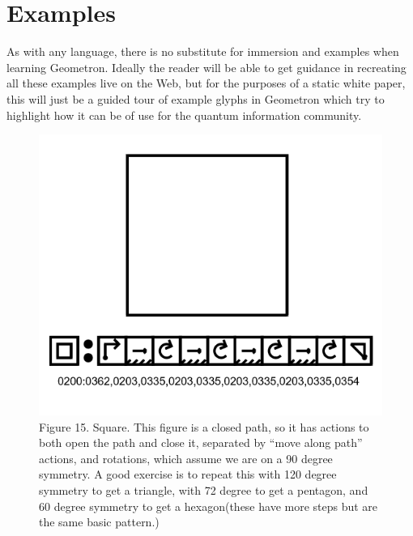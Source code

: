 \documentclass[11pt]{article}
\begin{document}
\section{Examples}


    As with any language, there is no substitute for immersion and examples when learning Geometron.  Ideally the reader will be able to get guidance in recreating all these examples live on the Web, but for the purposes of a static white paper, this will just be a guided tour of example glyphs in Geometron which try to highlight how it can be of use for the quantum information community.



\begin{figure}

\includegraphics[width=\linewidth]{figures/figure15_square.png}

\caption{Figure 15. Square.  This figure is a closed path, so it has actions to both open the path and close it, separated by ``move along path'' actions, and rotations, which assume we are on a 90 degree symmetry.  A good exercise is to repeat this with 120 degree symmetry to get a triangle, with 72 degree to get a pentagon, and 60 degree symmetry to get a hexagon(these have more steps but are the same basic pattern.)}
\end{figure}
\end{document}
